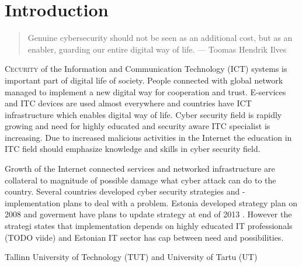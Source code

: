 \chapter{Introduction}
\label{Introduction}

 
\begin{quote}
Genuine cybersecurity should not be seen as an additional cost, but as an enabler, guarding our entire digital way of life. --- Toomas Hendrik Ilves
\end{quote}

\lettrine[lraise=0.1, nindent=0em, slope=-.5em]{\color{Violet}C}{ecurity} of the Information and Communication Technology (\gls{ICT}) systems is important part of digital life of society. People connected with global network managed to implement a new digital way for cooperation and trust. E-services and ITC devices are used almost everywhere and countries have \gls{ICT} infrastructure which enables digital way of life.
Cyber security field is rapidly growing and need for highly educated and security aware ITC specialist is increasing. Due to increased malicious activities in the Internet the education in ITC field should emphasize knowledge and skills in cyber security field.

Growth of the Internet connected services and networked infrastructure are collateral to magnitude of possible damage what cyber attack can do to the country. Several countries developed cyber security strategies and -implementation plans to deal with a problem.
Estonia developed strategy plan on 2008 \citep{Strategy2008} and goverment have plans to update strategy at end of 2013 \citep{StrategyProposal2013}. However the strategi states that implementation depends on highly educated IT professionals (TODO viide) and Estonian IT sector has cap between need and possibilities.

Tallinn University of Technology (\gls{TUT}) and University of Tartu (\gls{UT})


